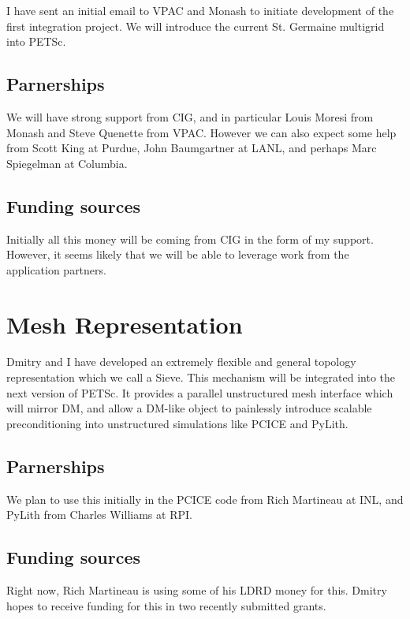 	I have sent an initial email to VPAC and Monash to initiate development of the first integration project. We
will introduce the current St. Germaine multigrid into PETSc.

  \subsection{Parnerships}

	We will have strong support from CIG, and in particular Louis Moresi from Monash and Steve Quenette from VPAC.
However we can also expect some help from Scott King at Purdue, John Baumgartner at LANL, and perhaps Marc Spiegelman at
Columbia.

  \subsection{Funding sources}

	Initially all this money will be coming from CIG in the form of my support. However, it seems likely that we
will be able to leverage work from the application partners.

\section{Mesh Representation}

	Dmitry and I have developed an extremely flexible and general topology representation which we call a Sieve.
This mechanism will be integrated into the next version of PETSc. It provides a parallel unstructured mesh interface
which will mirror DM, and allow a DM-like object to painlessly introduce scalable preconditioning into unstructured
simulations like PCICE and PyLith.

  \subsection{Parnerships}

	We plan to use this initially in the PCICE code from Rich Martineau at INL, and PyLith from Charles Williams at
RPI.

  \subsection{Funding sources}

	Right now, Rich Martineau is using some of his LDRD money for this. Dmitry hopes to receive funding for this in
two recently submitted grants.
